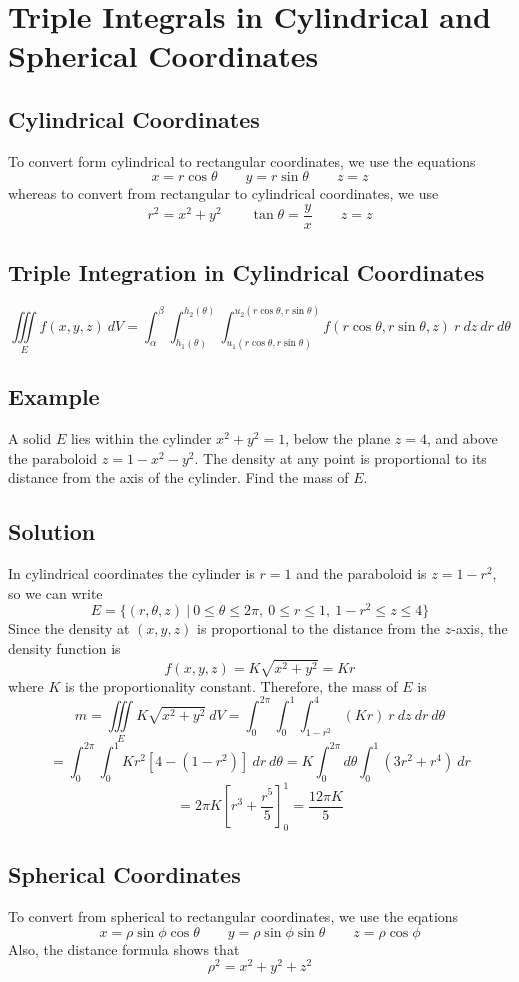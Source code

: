 \section{Triple Integrals in Cylindrical and Spherical Coordinates}

\subsection*{Cylindrical Coordinates}
To convert form cylindrical to rectangular coordinates, we use the equations
$$x=r\cos{\theta} \qquad y=r\sin{\theta} \qquad z=z$$
whereas to convert from rectangular to cylindrical coordinates, we use
$$r^2=x^2+y^2 \qquad \tan{\theta}=\frac{y}{x} \qquad z=z$$

\subsection*{Triple Integration in Cylindrical Coordinates}
$$\iiint\limits_E f(x,y,z)\:dV=\int_\alpha^\beta\int_{h_1(\theta)}^{h_2(\theta)}
    \int_{u_1(r\cos{\theta}, r\sin{\theta})}^{u_2(r\cos{\theta}, r\sin{\theta})}
    f(r\cos{\theta}, r\sin{\theta}, z)\:r\:dz\:dr\:d\theta$$

\subsection*{Example}
A solid $E$ lies within the cylinder $x^2+y^2=1$, below the plane $z=4$, and above
the paraboloid $z=1-x^2-y^2$. The density at any point is proportional to its distance
from the axis of the cylinder. Find the mass of $E$.

\subsection*{Solution}
In cylindrical coordinates the cylinder is $r=1$ and the paraboloid is $z=1-r^2$,
so we can write
$$E=\{(r,\theta,z)\:|\:0\leq\theta\leq 2\pi,\:0\leq r\leq 1,\: 1-r^2\leq z\leq 4\}$$
Since the density at $(x,y,z)$ is proportional to the distance from the $z$-axis, the
density function is
$$f(x,y,z)=K\sqrt{x^2+y^2}=Kr$$
where $K$ is the proportionality constant. Therefore, the mass of $E$ is
$$m=\iiint\limits_E K\sqrt{x^2+y^2}\:dV=\int_0^{2\pi}\int_0^1\int_{1-r^2}^4(Kr)\:r\:dz\:dr\:d\theta$$
$$=\int_0^{2\pi}\int_0^1 Kr^2[4-(1-r^2)]\:dr\:d\theta=K\int_0^{2\pi} d\theta\int_0^1(3r^2+r^4)\:dr$$
$$=2\pi K\left[r^3+\frac{r^5}{5}\right]_0^1=\frac{12\pi K}{5}$$

\subsection*{Spherical Coordinates}
To convert from spherical to rectangular coordinates, we use the eqations
$$x=\rho\sin{\phi}\cos{\theta} \qquad y=\rho\sin{\phi}\sin{\theta} \qquad z=\rho\cos{\phi}$$
Also, the distance formula shows that
$$\rho^2=x^2+y^2+z^2$$

